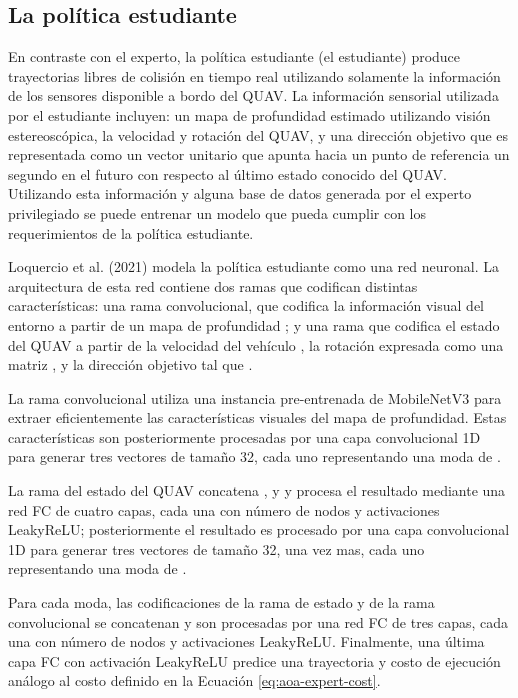\subsection{La política estudiante} 

\label{sec:aoa-student}

En contraste con el experto, la política estudiante (el estudiante) produce trayectorias libres de colisión en tiempo real utilizando solamente la información de los sensores disponible a bordo del QUAV. La información sensorial utilizada por el estudiante incluyen: un mapa de profundidad estimado utilizando visión estereoscópica, la velocidad y rotación del QUAV, y una dirección objetivo que es representada como un vector unitario que apunta hacia un punto de referencia un segundo en el futuro con respecto al último estado conocido del QUAV. Utilizando esta información y alguna base de datos generada por el experto privilegiado se puede entrenar un modelo que pueda cumplir con los requerimientos de la política estudiante.

Loquercio et al. (2021) \cite{Loquercio2021} modela la política estudiante como una red neuronal. La arquitectura de esta red contiene dos ramas que codifican distintas características: una rama convolucional, que codifica la información visual del entorno a partir de un mapa de profundidad ; y una rama que codifica el estado del QUAV a partir de la velocidad del vehículo , la rotación expresada como una matriz , y la dirección objetivo  tal que . 

La rama convolucional utiliza una instancia pre-entrenada de MobileNetV3 \cite{Howard2019} para extraer eficientemente las características visuales del mapa de profundidad. Estas características son posteriormente procesadas por una capa convolucional 1D para generar tres vectores de tamaño 32, cada uno representando una moda de . 

La rama del estado del QUAV concatena ,  y  y procesa el resultado mediante una red FC de cuatro capas, cada una con \jim{[64,32,32,32]} número de nodos y activaciones LeakyReLU; posteriormente el resultado es procesado por una capa convolucional 1D para generar tres vectores de tamaño 32, una vez mas, cada uno representando una moda de .

Para cada moda, las codificaciones de la rama de estado y de la rama convolucional se concatenan y son procesadas por una red FC de tres capas, cada una con \jim{[64,128,128]} número de nodos y activaciones LeakyReLU. Finalmente, una última capa FC con activación LeakyReLU predice una trayectoria \jim{\tau} y costo de ejecución análogo al costo definido en la Ecuación \ref{eq:aoa-expert-cost}. 


